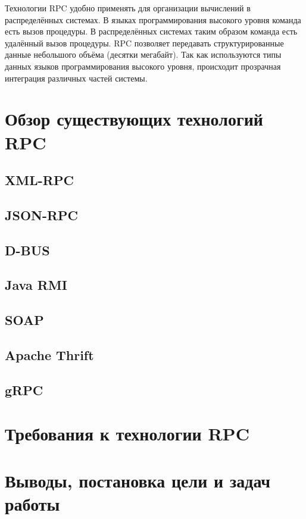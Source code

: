 Технологии RPC удобно применять для организации вычислений в распределённых
системах. В языках программирования высокого уровня команда есть вызов процедуры.
В распределённых системах таким образом команда есть удалённый вызов процедуры.
RPC позволяет передавать структурированные данные небольшого объёма (десятки
мегабайт). Так как используются типы данных языков программирования высокого
уровня, происходит прозрачная интеграция различных частей системы.

\section{Обзор существующих технологий RPC}
\subsection{XML-RPC}
\subsection{JSON-RPC}
\subsection{D-BUS}
\subsection{Java RMI}
\subsection{SOAP}
\subsection{Apache Thrift}
\subsection{gRPC}

\section{Требования к технологии RPC}

\section{Выводы, постановка цели и задач работы}
